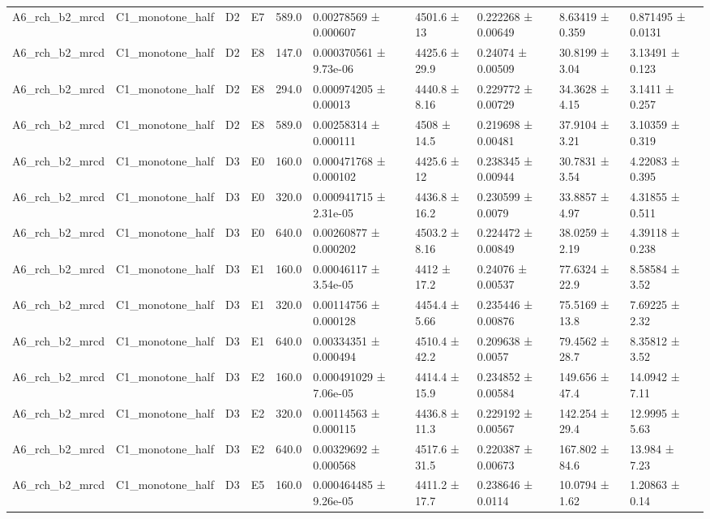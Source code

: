 \begin{table}
\begin{tabular}{llllllllll}
A6\_rch\_b2\_mrcd & C1\_monotone\_half & D2 & E7 & 589.0 & 0.00278569 ± 0.000607 & 4501.6 ± 13 & 0.222268 ± 0.00649 & 8.63419 ± 0.359 & 0.871495 ± 0.0131 \\
A6\_rch\_b2\_mrcd & C1\_monotone\_half & D2 & E8 & 147.0 & 0.000370561 ± 9.73e-06 & 4425.6 ± 29.9 & 0.24074 ± 0.00509 & 30.8199 ± 3.04 & 3.13491 ± 0.123 \\
A6\_rch\_b2\_mrcd & C1\_monotone\_half & D2 & E8 & 294.0 & 0.000974205 ± 0.00013 & 4440.8 ± 8.16 & 0.229772 ± 0.00729 & 34.3628 ± 4.15 & 3.1411 ± 0.257 \\
A6\_rch\_b2\_mrcd & C1\_monotone\_half & D2 & E8 & 589.0 & 0.00258314 ± 0.000111 & 4508 ± 14.5 & 0.219698 ± 0.00481 & 37.9104 ± 3.21 & 3.10359 ± 0.319 \\
A6\_rch\_b2\_mrcd & C1\_monotone\_half & D3 & E0 & 160.0 & 0.000471768 ± 0.000102 & 4425.6 ± 12 & 0.238345 ± 0.00944 & 30.7831 ± 3.54 & 4.22083 ± 0.395 \\
A6\_rch\_b2\_mrcd & C1\_monotone\_half & D3 & E0 & 320.0 & 0.000941715 ± 2.31e-05 & 4436.8 ± 16.2 & 0.230599 ± 0.0079 & 33.8857 ± 4.97 & 4.31855 ± 0.511 \\
A6\_rch\_b2\_mrcd & C1\_monotone\_half & D3 & E0 & 640.0 & 0.00260877 ± 0.000202 & 4503.2 ± 8.16 & 0.224472 ± 0.00849 & 38.0259 ± 2.19 & 4.39118 ± 0.238 \\
A6\_rch\_b2\_mrcd & C1\_monotone\_half & D3 & E1 & 160.0 & 0.00046117 ± 3.54e-05 & 4412 ± 17.2 & 0.24076 ± 0.00537 & 77.6324 ± 22.9 & 8.58584 ± 3.52 \\
A6\_rch\_b2\_mrcd & C1\_monotone\_half & D3 & E1 & 320.0 & 0.00114756 ± 0.000128 & 4454.4 ± 5.66 & 0.235446 ± 0.00876 & 75.5169 ± 13.8 & 7.69225 ± 2.32 \\
A6\_rch\_b2\_mrcd & C1\_monotone\_half & D3 & E1 & 640.0 & 0.00334351 ± 0.000494 & 4510.4 ± 42.2 & 0.209638 ± 0.0057 & 79.4562 ± 28.7 & 8.35812 ± 3.52 \\
A6\_rch\_b2\_mrcd & C1\_monotone\_half & D3 & E2 & 160.0 & 0.000491029 ± 7.06e-05 & 4414.4 ± 15.9 & 0.234852 ± 0.00584 & 149.656 ± 47.4 & 14.0942 ± 7.11 \\
A6\_rch\_b2\_mrcd & C1\_monotone\_half & D3 & E2 & 320.0 & 0.00114563 ± 0.000115 & 4436.8 ± 11.3 & 0.229192 ± 0.00567 & 142.254 ± 29.4 & 12.9995 ± 5.63 \\
A6\_rch\_b2\_mrcd & C1\_monotone\_half & D3 & E2 & 640.0 & 0.00329692 ± 0.000568 & 4517.6 ± 31.5 & 0.220387 ± 0.00673 & 167.802 ± 84.6 & 13.984 ± 7.23 \\
A6\_rch\_b2\_mrcd & C1\_monotone\_half & D3 & E5 & 160.0 & 0.000464485 ± 9.26e-05 & 4411.2 ± 17.7 & 0.238646 ± 0.0114 & 10.0794 ± 1.62 & 1.20863 ± 0.14 \\

\end{tabular}
\end{table}
